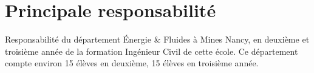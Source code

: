\documentclass[12pt]{report}
\begin{document}
\section{Principale responsabilité}
Responsabilité du département Énergie \& Fluides
à Mines Nancy, en deuxième et troisième année de la formation Ingénieur Civil
de cette école.
Ce département compte environ 15 élèves en deuxième,
15 élèves en troisième année.





\end{document}
